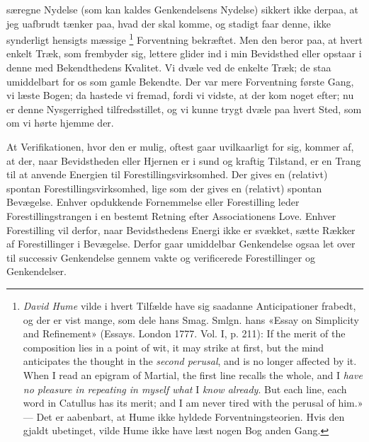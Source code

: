 \documentclass[12pt,a4paper,openany]{book}
\newcommand{\opage}[1]{\marginnote{\footnotesize\textit{[#1]}}}
\begin{document}
særegne Nydelse (som kan kaldes Genkendelsens Nydelse) sikkert ikke derpaa, at
jeg uafbrudt tænker paa, hvad der skal komme, og stadigt faar denne, ikke
synderligt hensigts%
\setcounter{footnote}{0}%
\opage{20}mæssige%
\footnote[1]{\emph{David Hume} vilde i hvert Tilfælde have sig saadanne
Anticipationer frabedt, og der er vist mange, som dele hans Smag. Smlgn. hans
«Essay on Simplicity and Refinement» (Essays. London 1777. Vol. I, p. 211): If
the merit of the composition lies in a point of wit, it may strike at first,
but the mind anticipates the thought in the \emph{second perusal}, and is no
longer affected by it. When I read an epigram of Martial, the first line
recalls the whole, and I \emph{have no pleasure in repeating in myself what} I
\emph{know already}. But each line, each word in Catullus has its merit; and I
am never tired with the perusal of him.» --- Det er aabenbart, at Hume ikke
hyldede Forventningsteorien. Hvis den gjaldt ubetinget, vilde Hume ikke have
læst nogen Bog anden Gang.} Forventning bekræftet. Men den beror paa, at hvert
enkelt Træk, som frembyder sig, lettere glider ind i min Bevidsthed eller
opstaar i denne med Bekendthedens Kvalitet. Vi dvæle ved de enkelte Træk; de
staa umiddelbart for os som gamle Bekendte. Der var mere Forventning første
Gang, vi læste Bogen; da hastede vi fremad, fordi vi vidste, at der kom noget
efter; nu er denne Nysgerrighed tilfredsstillet, og vi kunne trygt dvæle paa
hvert Sted, som om vi hørte hjemme der.

At Verifikationen, hvor den er mulig, oftest gaar uvilkaarligt for sig, kommer
af, at der, naar Bevidstheden eller Hjernen er i sund og kraftig Tilstand, er
en Trang til at anvende Energien til Forestillingsvirksomhed. Der gives en
(relativt) spontan Forestillingsvirksomhed, lige som der gives en (relativt)
spontan Bevægelse. Enhver opdukkende Fornemmelse eller Forestilling leder
Forestillingstrangen i en bestemt Retning efter Associationens Love. Enhver
Forestilling vil derfor, naar Bevidsthedens Energi ikke er svækket, sætte
Rækker af Forestillinger i Bevægelse. Derfor gaar umiddelbar Genkendelse ogsaa
let over til successiv Genkendelse gennem vakte og verificerede Forestillinger
og Genkendelser.
\end{document}
